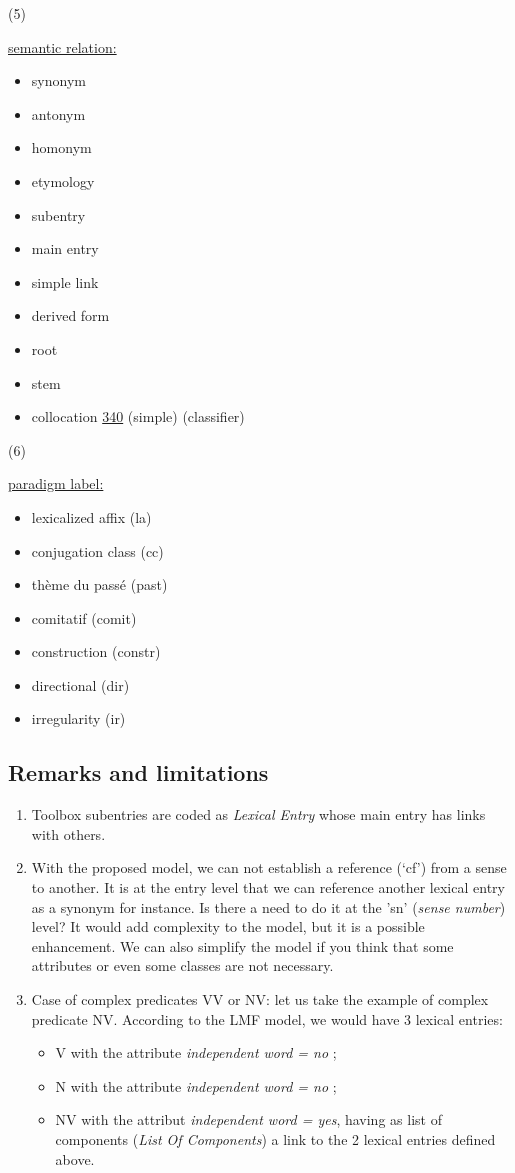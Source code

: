 \documentclass[a4paper,12pt]{article}
\begin{document}
\hypertarget{5}{(5)}
\hyperlink{relation}{semantic relation:}
\begin{itemize}
\item synonym
\item antonym
\item homonym
\item etymology
\item subentry
\item main entry
\item simple link
\item derived form
\item root
\item stem
\item collocation \href{http://www.isocat.org/datcat/DC-340}{340} (simple) (classifier)
\end{itemize}

\hypertarget{6}{(6)}
\hyperlink{paradigm}{paradigm label:}
\begin{itemize}
\item lexicalized affix (la)
\item conjugation class (cc)
\item th\`eme du pass\'e (past)
\item comitatif (comit)
\item construction (constr)
\item directional (dir)
\item irregularity (ir)
\end{itemize}

\subsection{Remarks and limitations}

\begin{enumerate}
\item Toolbox subentries are coded as \textit{Lexical Entry} whose main entry has links with others.
\item With the proposed model, we can not establish a reference (`cf') from a sense to another. It is at the entry level that we can reference another lexical entry as a synonym for instance. Is there a need to do it at the 'sn' (\textit{sense number}) level? It would add complexity to the model, but it is a possible enhancement. We can also simplify the model if you think that some attributes or even some classes are not necessary.
\item Case of complex predicates VV or NV: let us take the example of complex predicate NV. According to the LMF model, we would have 3 lexical entries:
\begin{itemize}
\item V with the attribute \textit{independent word = no} ;
\item N with the attribute \textit{independent word = no} ;
\item NV with the attribut \textit{independent word = yes}, having as list of components (\textit{List Of Components}) a link to the 2 lexical entries defined above.
\end{itemize}
\end{enumerate}
\end{document}
